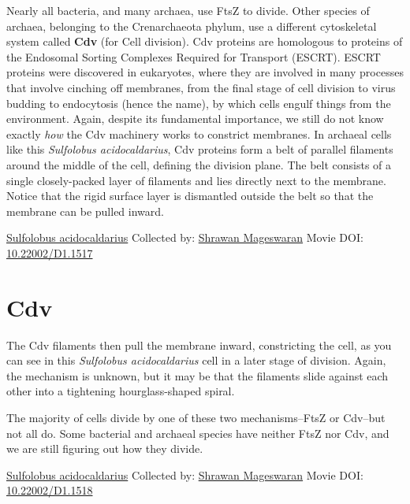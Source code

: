\documentclass[]{tufte-book}
\begin{document}
Nearly all bacteria, and many archaea, use FtsZ to divide. Other species of archaea, belonging to the Crenarchaeota phylum, use a different cytoskeletal system called \textbf{Cdv} (for Cell division). Cdv proteins are homologous to proteins of the Endosomal Sorting Complexes Required for Transport (ESCRT). ESCRT proteins were discovered in eukaryotes, where they are involved in many processes that involve cinching off membranes, from the final stage of cell division to virus budding to endocytosis (hence the name), by which cells engulf things from the environment. Again, despite its fundamental importance, we still do not know exactly \emph{how} the Cdv machinery works to constrict membranes. In archaeal cells like this \emph{Sulfolobus acidocaldarius}, Cdv proteins form a belt of parallel filaments around the middle of the cell, defining the division plane. The belt consists of a single closely-packed layer of filaments and lies directly next to the membrane. Notice that the rigid surface layer is dismantled outside the belt so that the membrane can be pulled inward.



\hypertarget{htmlwidget-3ec021e40962c0b199f7}{}

\label{fig:5-11}\protect\hyperlink{tree}{Sulfolobus acidocaldarius} Collected by: \protect\hyperlink{shrawan_mageswaran}{Shrawan Mageswaran} Movie DOI: \href{https://doi.org/10.22002/D1.1517}{10.22002/D1.1517}

\hypertarget{cdv}{%
\section{Cdv}\label{cdv}}

The Cdv filaments then pull the membrane inward, constricting the cell, as you can see in this \emph{Sulfolobus acidocaldarius} cell in a later stage of division. Again, the mechanism is unknown, but it may be that the filaments slide against each other into a tightening hourglass-shaped spiral.

The majority of cells divide by one of these two mechanisms--FtsZ or Cdv--but not all do. Some bacterial and archaeal species have neither FtsZ nor Cdv, and we are still figuring out how they divide.



\hypertarget{htmlwidget-b16d3de8e8e2632bfb2f}{}

\label{fig:5-12}\protect\hyperlink{tree}{Sulfolobus acidocaldarius} Collected by: \protect\hyperlink{shrawan_mageswaran}{Shrawan Mageswaran} Movie DOI: \href{https://doi.org/10.22002/D1.1518}{10.22002/D1.1518}
\end{document}
